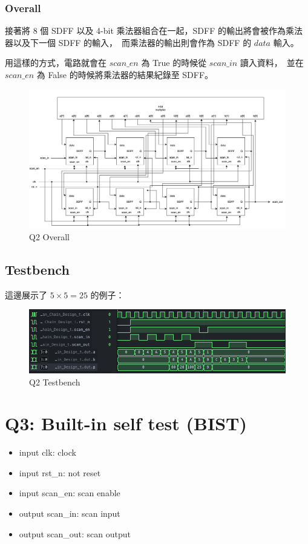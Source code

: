\documentclass[10.5pt,compsoc,UTF8]{CjC}
\theoremstyle{mystyle}
\begin{document}
\subsubsection*{Overall}
接著將 8 個 SDFF 以及 4-bit 乘法器組合在一起，SDFF 的輸出將會被作為乘法器以及下一個 SDFF 的輸入，\
而乘法器的輸出則會作為 SDFF 的 $data$ 輸入。\
\par
用這樣的方式，電路就會在 $scan\_en$ 為 True 的時候從 $scan\_in$ 讀入資料，\
並在 $scan\_en$ 為 False 的時候將乘法器的結果紀錄至 SDFF。

\begin{figure}[h!]
  \centering
  \includegraphics[width=\textwidth]{./img/Q2.png}
  \caption{Q2 Overall}
  \label{fig:Q2-Overall}
\end{figure}
\newpage
\subsection{Testbench}
這邊展示了 $5 \times 5 = 25$ 的例子：

\begin{figure}[h!]
  \centering
  \includegraphics[width=\textwidth]{./img/Q2-tb.png}
  \caption{Q2 Testbench}
  \label{fig:Q2-Testbench}
\end{figure}


\section{Q3: Built-in self test (BIST)}
\begin{itemize}
  \item input clk: clock
  \item input rst\_n: not reset
  \item input scan\_en: scan enable
  \item output scan\_in: scan input
  \item output scan\_out: scan output
\end{itemize}
\end{document}
